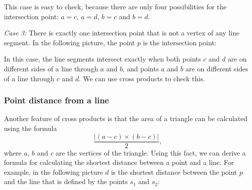 \begin{center}
\end{center}

This case is easy to check, because
there are only four possibilities
for the intersection point:
$a=c$, $a=d$, $b=c$ and $b=d$.

\textit{Case 3:}
There is exactly one intersection point
that is not a vertex of any line segment.
In the following picture, the point $p$
is the intersection point:
\begin{center}
\end{center}

In this case, the line segments intersect
exactly when both points $c$ and $d$ are
on different sides of a line through $a$ and $b$,
and points $a$ and $b$ are on different
sides of a line through $c$ and $d$.
We can use cross products to check this.

\subsubsection{Point distance from a line}

Another feature of cross products is that
the area of a triangle can be calculated
using the formula
\[\frac{| (a-c) \times (b-c) |}{2},\]
where $a$, $b$ and $c$ are the vertices of the triangle.
Using this fact, we can derive a formula
for calculating the shortest distance between a point and a line.
For example, in the following picture $d$ is the
shortest distance between the point $p$ and the line
that is defined by the points $s_1$ and $s_2$:
\begin{center}
\end{center}

